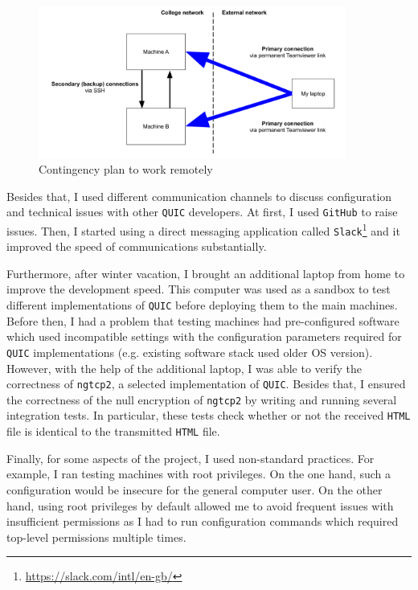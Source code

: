 \documentclass[12pt,a4paper,twoside,openright]{report}
\begin{document}
    \begin{figure}[ht]
    \centering
    \includegraphics[width=0.9\textwidth]{figs/Setup map.png}
    \caption{Contingency plan to work remotely}
    \label{fig:setup_map}
    \end{figure}

    Besides that, I used different communication channels to discuss configuration and technical issues with other \texttt{QUIC} developers.
    At first, I used \texttt{GitHub} to raise issues.
    Then, I started using a direct messaging application called \texttt{Slack}\footnote{\url{https://slack.com/intl/en-gb/}} 
    and it improved the speed of communications substantially.

    Furthermore, after winter vacation, I brought an additional laptop from home to improve the development speed.
    This computer was used as a sandbox to test different implementations of \texttt{QUIC} before deploying them to the main machines.
    Before then, I had a problem that testing machines had pre-configured software which used incompatible settings with the configuration parameters required for \texttt{QUIC} implementations (e.g. existing software stack used older OS version).
    However, with the help of the additional laptop, I was able to verify the correctness of \texttt{ngtcp2}, a selected implementation of \texttt{QUIC}.
    Besides that, I ensured the correctness of the null encryption of \texttt{ngtcp2} by writing and running several integration tests.
    In particular, these tests check whether or not the received \texttt{HTML} file is identical to the transmitted \texttt{HTML} file.
    
    Finally, for some aspects of the project, I used non-standard practices.
    For example, I ran testing machines with root privileges.
    On the one hand, such a configuration would be insecure for the general computer user. On the other hand, using root privileges by default allowed me to avoid frequent issues with insufficient permissions as I had to run configuration commands which required top-level permissions multiple times.
    
\end{document}
